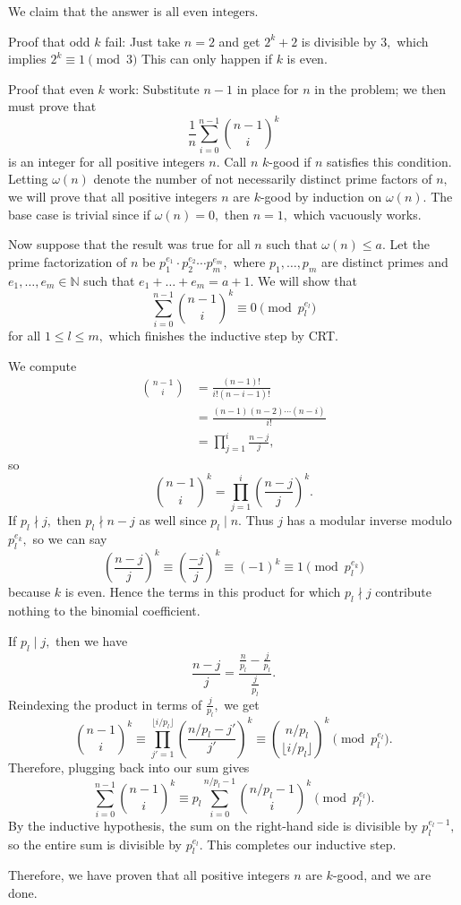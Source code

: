 We claim that the answer is $\boxed{\text{all even integers}}.$

Proof that odd $k$ fail: Just take $n = 2$ and get $2^k + 2$ is divisible by $3,$ which implies $2^k \equiv 1 \pmod{3}$ This can only happen if $k$ is even.

Proof that even $k$ work: Substitute $n-1$ in place for $n$ in the problem; we then must prove that$$\frac{1}{n} \sum_{i=0}^{n-1} \binom{n-1}{i}^k$$is an integer for all positive integers $n.$ Call $n$ $k$-good if $n$ satisfies this condition. Letting $\omega(n)$ denote the number of not necessarily distinct prime factors of $n,$ we will prove that all positive integers $n$ are $k$-good by induction on $\omega(n).$ The base case is trivial since if $\omega(n) = 0,$ then $n = 1,$ which vacuously works.

Now suppose that the result was true for all $n$ such that $\omega(n) \le a.$ Let the prime factorization of $n$ be $p_1^{e_1} \cdot p_2^{e_2} \cdots p_m^{e_m},$ where $p_1, \dots, p_m$ are distinct primes and $e_1, \dots, e_m \in \mathbb{N}$ such that $e_1 + \dots + e_m = a+1.$ We will show that$$\sum_{i=0}^{n-1} \binom{n-1}{i}^k \equiv 0 \pmod{p_l^{e_l}}$$for all $1 \le l \le m,$ which finishes the inductive step by CRT.

We compute
\begin{align*}
\binom{n-1}{i} &= \frac{(n-1)!}{i! (n-i-1)!} \\
&= \frac{(n-1)(n-2)\cdots (n-i)}{i!} \\
&= \prod_{j=1}^i \frac{n-j}{j},
\end{align*}so$$\binom{n-1}{i}^k = \prod_{j=1}^i \left(\frac{n-j}{j}\right)^k.$$If $p_l \nmid j,$ then $p_l \nmid n-j$ as well since $p_l \mid n.$ Thus $j$ has a modular inverse modulo $p_l^{e_k},$ so we can say$$\left(\frac{n-j}{j}\right)^k \equiv \left(\frac{-j}{j}\right)^k \equiv (-1)^k \equiv 1 \pmod{p_l^{e_k}}$$because $k$ is even. Hence the terms in this product for which $p_l \nmid j$ contribute nothing to the binomial coefficient.

If $p_l \mid j,$ then we have$$\frac{n-j}{j} = \frac{\frac{n}{p_l} - \frac{j}{p_l}}{\frac{j}{p_l}}.$$Reindexing the product in terms of $\frac{j}{p_l},$ we get$$\binom{n-1}{i}^k \equiv \prod_{j'=1}^{\lfloor i/p_l \rfloor} \left(\frac{n/p_l - j'}{j'}\right)^k \equiv \binom{n/p_l}{\lfloor i/p_l \rfloor}^k \pmod{p_l^{e_l}}.$$Therefore, plugging back into our sum gives$$\sum_{i=0}^{n-1} \binom{n-1}{i}^k \equiv p_l \sum_{i=0}^{n/p_l - 1} \binom{n/p_l - 1}{i}^k \pmod{p_l^{e_l}}.$$By the inductive hypothesis, the sum on the right-hand side is divisible by $p_l^{e_l - 1},$ so the entire sum is divisible by $p_l^{e_l}.$ This completes our inductive step.

Therefore, we have proven that all positive integers $n$ are $k$-good, and we are done.